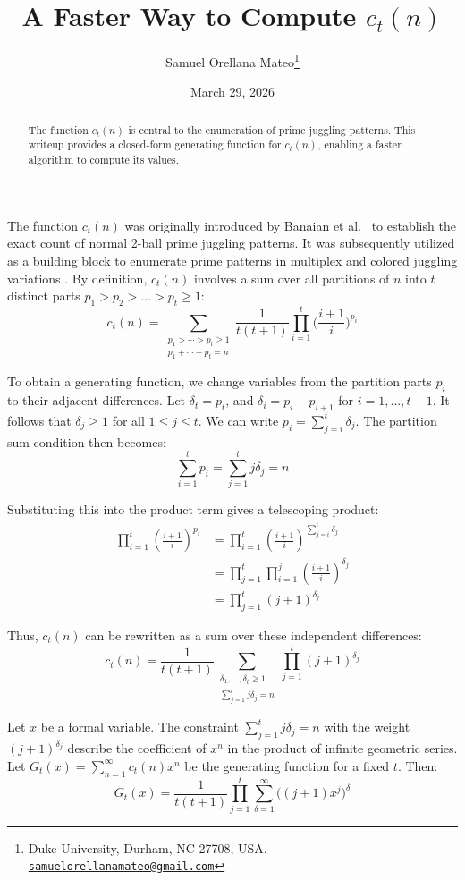 \documentclass[12pt]{article}
\title{A Faster Way to Compute $c_t(n)$}
\author{Samuel Orellana Mateo\thanks{Duke University, Durham, NC 27708, USA. \href{mailto:samuelorellanamateo@gmail.com}{\texttt{samuelorellanamateo@gmail.com}}}}
\date{March 29, 2026}
\begin{document}
\maketitle

\begin{abstract}
    The function $c_t(n)$ is central to the enumeration of prime juggling patterns. This writeup provides a closed-form generating function for $c_t(n)$, enabling a faster algorithm to compute its values.
\end{abstract}

\vspace{1em}

The function $c_t(n)$ was originally introduced by Banaian et al.\ \cite{Banaian2016} to establish the exact count of normal 2-ball prime juggling patterns. It was subsequently utilized as a building block to enumerate prime patterns in multiplex and colored juggling variations \cite{butler2026}. By definition, $c_t(n)$ involves a sum over all partitions of $n$ into $t$ distinct parts $p_1 > p_2 > \dots > p_t \ge 1$:
\[
    c_t(n) = \sum_{\substack{p_1>\cdots>p_t \ge 1 \\ p_1+\cdots+p_t=n}}
    \frac{1}{t(t+1)}\prod_{i=1}^t\bigg(\frac{i+1}{i}\bigg)^{p_i}
\]

To obtain a generating function, we change variables from the partition parts $p_i$ to their adjacent differences. Let $\delta_t = p_t$, and $\delta_{i} = p_{i} - p_{i+1}$ for $i = 1, \dots, t-1$. It follows that $\delta_j \ge 1$ for all $1 \le j \le t$. We can write $p_i = \sum_{j=i}^t \delta_j$. The partition sum condition then becomes:
\[
    \sum_{i=1}^t p_i = \sum_{j=1}^t j \delta_j = n
\]

Substituting this into the product term gives a telescoping product:
\begin{align*}
    \prod_{i=1}^t \left(\frac{i+1}{i}\right)^{p_i} 
    &= \prod_{i=1}^t \left(\frac{i+1}{i}\right)^{\sum_{j=i}^t \delta_j} \\
    &= \prod_{j=1}^t \prod_{i=1}^j \left(\frac{i+1}{i}\right)^{\delta_j} \\
    &= \prod_{j=1}^t (j+1)^{\delta_j}
\end{align*}

Thus, $c_t(n)$ can be rewritten as a sum over these independent differences:
\[
    c_t(n) = \frac{1}{t(t+1)} \sum_{\substack{\delta_1, \dots, \delta_t \ge 1 \\ \sum_{j=1}^t j \delta_j = n}} \prod_{j=1}^t (j+1)^{\delta_j}
\]

Let $x$ be a formal variable. The constraint $\sum_{j=1}^t j \delta_j = n$ with the weight $(j+1)^{\delta_j}$ describe the coefficient of $x^n$ in the product of infinite geometric series. Let $G_t(x) = \sum_{n=1}^\infty c_t(n) x^n$ be the generating function for a fixed $t$. Then:
\[
    G_t(x) = \frac{1}{t(t+1)} \prod_{j=1}^t \sum_{\delta=1}^\infty \Big( (j+1) x^j \Big)^\delta
\]
\end{document}
